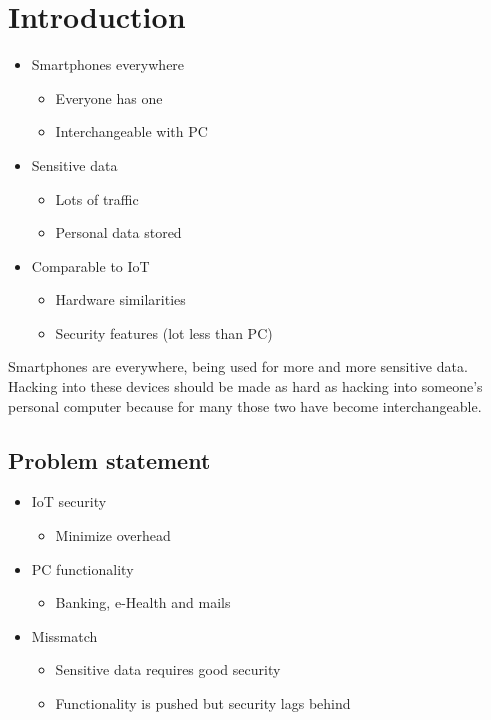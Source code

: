 \documentclass{report}
\begin{document}
\chapter{Introduction}

\begin{itemize}
\item Smartphones everywhere \begin{itemize}
\item Everyone has one
\item Interchangeable with PC
\end{itemize}
\item Sensitive data \begin{itemize}
\item Lots of traffic
\item Personal data stored
\end{itemize}
\item Comparable to IoT \begin{itemize}
\item Hardware similarities
\item Security features (lot less than PC)
\end{itemize}
\end{itemize}

Smartphones are everywhere, being used for more and more sensitive data. Hacking into these devices should be made as hard as hacking into someone's personal computer because for many those two have become interchangeable.

\section{Problem statement}

\begin{itemize}
\item IoT security \begin{itemize}
\item Minimize overhead
\end{itemize}
\item PC functionality \begin{itemize}
\item Banking, e-Health and mails
\end{itemize}
\item Missmatch \begin{itemize}
\item Sensitive data requires good security
\item Functionality is pushed but security lags behind
\end{itemize}
\end{itemize}
\end{document}
